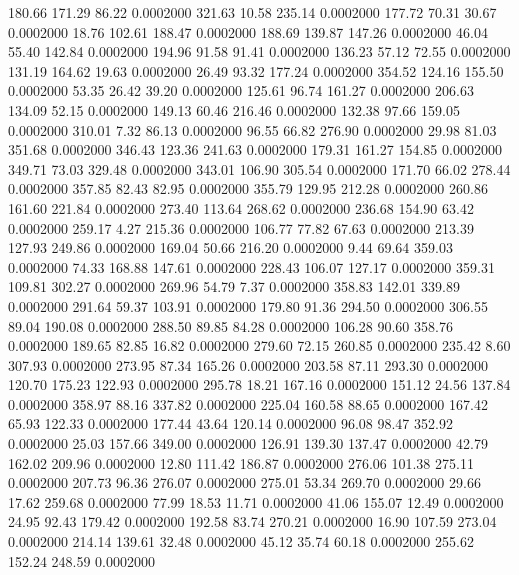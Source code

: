  180.66  171.29   86.22   0.0002000
 321.63   10.58  235.14   0.0002000
 177.72   70.31   30.67   0.0002000
  18.76  102.61  188.47   0.0002000
 188.69  139.87  147.26   0.0002000
  46.04   55.40  142.84   0.0002000
 194.96   91.58   91.41   0.0002000
 136.23   57.12   72.55   0.0002000
 131.19  164.62   19.63   0.0002000
  26.49   93.32  177.24   0.0002000
 354.52  124.16  155.50   0.0002000
  53.35   26.42   39.20   0.0002000
 125.61   96.74  161.27   0.0002000
 206.63  134.09   52.15   0.0002000
 149.13   60.46  216.46   0.0002000
 132.38   97.66  159.05   0.0002000
 310.01    7.32   86.13   0.0002000
  96.55   66.82  276.90   0.0002000
  29.98   81.03  351.68   0.0002000
 346.43  123.36  241.63   0.0002000
 179.31  161.27  154.85   0.0002000
 349.71   73.03  329.48   0.0002000
 343.01  106.90  305.54   0.0002000
 171.70   66.02  278.44   0.0002000
 357.85   82.43   82.95   0.0002000
 355.79  129.95  212.28   0.0002000
 260.86  161.60  221.84   0.0002000
 273.40  113.64  268.62   0.0002000
 236.68  154.90   63.42   0.0002000
 259.17    4.27  215.36   0.0002000
 106.77   77.82   67.63   0.0002000
 213.39  127.93  249.86   0.0002000
 169.04   50.66  216.20   0.0002000
   9.44   69.64  359.03   0.0002000
  74.33  168.88  147.61   0.0002000
 228.43  106.07  127.17   0.0002000
 359.31  109.81  302.27   0.0002000
 269.96   54.79    7.37   0.0002000
 358.83  142.01  339.89   0.0002000
 291.64   59.37  103.91   0.0002000
 179.80   91.36  294.50   0.0002000
 306.55   89.04  190.08   0.0002000
 288.50   89.85   84.28   0.0002000
 106.28   90.60  358.76   0.0002000
 189.65   82.85   16.82   0.0002000
 279.60   72.15  260.85   0.0002000
 235.42    8.60  307.93   0.0002000
 273.95   87.34  165.26   0.0002000
 203.58   87.11  293.30   0.0002000
 120.70  175.23  122.93   0.0002000
 295.78   18.21  167.16   0.0002000
 151.12   24.56  137.84   0.0002000
 358.97   88.16  337.82   0.0002000
 225.04  160.58   88.65   0.0002000
 167.42   65.93  122.33   0.0002000
 177.44   43.64  120.14   0.0002000
  96.08   98.47  352.92   0.0002000
  25.03  157.66  349.00   0.0002000
 126.91  139.30  137.47   0.0002000
  42.79  162.02  209.96   0.0002000
  12.80  111.42  186.87   0.0002000
 276.06  101.38  275.11   0.0002000
 207.73   96.36  276.07   0.0002000
 275.01   53.34  269.70   0.0002000
  29.66   17.62  259.68   0.0002000
  77.99   18.53   11.71   0.0002000
  41.06  155.07   12.49   0.0002000
  24.95   92.43  179.42   0.0002000
 192.58   83.74  270.21   0.0002000
  16.90  107.59  273.04   0.0002000
 214.14  139.61   32.48   0.0002000
  45.12   35.74   60.18   0.0002000
 255.62  152.24  248.59   0.0002000
